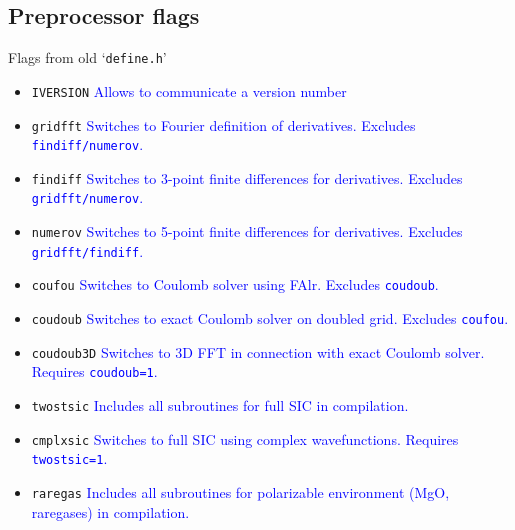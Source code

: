 \documentclass[11pt]{article}
\newcommand{\PGR}[1]{\textcolor{blue}{#1}}
\begin{document}
		\subsection{Preprocessor flags}
			Flags from old `\texttt{define.h}'
			\begin{itemize}
				\item \texttt{IVERSION}
                                 \PGR{Allows to communicate a version number}
				\item \texttt{gridfft} 
                                  \PGR{Switches
                                  to Fourier definition of
                                  derivatives. Excludes
                                  \texttt{findiff/numerov}.}
				\item \texttt{findiff}
                                  \PGR{Switches
                                  to 3-point finite differences for
                                  derivatives. Excludes
                                  \texttt{gridfft/numerov}.}
				\item \texttt{numerov}
                                  \PGR{Switches
                                  to 5-point finite differences for
                                  derivatives. Excludes
                                  \texttt{gridfft/findiff}.}
				\item \texttt{coufou}
                                  \PGR{Switches
                                  to Coulomb solver using FAlr.
                                  Excludes \texttt{coudoub}.}
				\item \texttt{coudoub}
                                  \PGR{Switches
                                  to exact Coulomb solver on doubled grid.
                                  Excludes \texttt{coufou}.}
				\item \texttt{coudoub3D}
                                  \PGR{Switches
                                  to 3D FFT in connection with exact
                                  Coulomb solver. 
                                  Requires \texttt{coudoub=1}.}
				\item \texttt{twostsic}
                                  \PGR{Includes all subroutines for
                                    full SIC in compilation.}
				\item \texttt{cmplxsic}
                                  \PGR{Switches to full SIC using
                                    complex wavefunctions. Requires
                                    \texttt{twostsic=1}.} 
				\item \texttt{raregas}
                                  \PGR{Includes all subroutines for
                                    polarizable environment (MgO,
                                    raregases) in compilation.} 
			\end{itemize}
			
\end{document}
